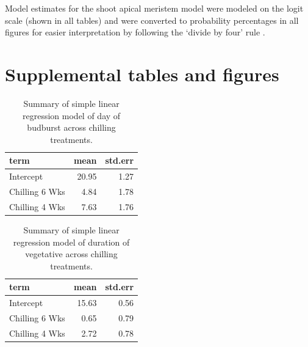 \documentclass{article}\usepackage[]{graphicx}\usepackage[]{color}
\begin{document}
Model estimates for the shoot apical meristem model were modeled on the logit scale (shown in all tables) and were converted to probability percentages in all figures for easier interpretation by following the `divide by four' rule \citep{Gelman2006}.



\section*{Supplemental tables and figures}

\begin{table}[H]
\centering
\caption{Summary of simple linear regression model of day of budburst across chilling treatments.} 
\label{tab:simpbb}
\begin{tabular}{lrr}
  \hline
term & mean & std.err \\ 
  \hline
Intercept & 20.95 & 1.27 \\ 
  Chilling 6 Wks & 4.84 & 1.78 \\ 
  Chilling 4 Wks & 7.63 & 1.76 \\ 
   \hline
\end{tabular}
\end{table}
\begin{table}[H]
\centering
\caption{Summary of simple linear regression model of duration of vegetative across chilling treatments.} 
\label{tab:simpdvr}
\begin{tabular}{lrr}
  \hline
term & mean & std.err \\ 
  \hline
Intercept & 15.63 & 0.56 \\ 
  Chilling 6 Wks & 0.65 & 0.79 \\ 
  Chilling 4 Wks & 2.72 & 0.78 \\ 
   \hline
\end{tabular}
\end{table}
\end{document}
